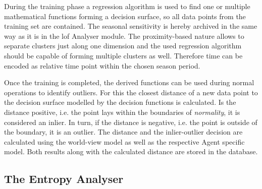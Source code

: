 During the training phase a regression algorithm is used to find one or multiple mathematical functions forming a decision surface, so all data points from the training set are contained.
The seasonal sensitivity is hereby archived in the same way as it is in the \gls{lof} Analyser module. The proximity-based nature allows to separate clusters just along one dimension and the used regression algorithm should be capable of forming multiple clusters as well. Therefore time can be encoded as relative time point within the chosen season period.

Once the training is completed, the derived functions can be used during normal operations to identify outliers.
For this the closest distance of a new data point to the decision surface modelled by the decision functions is calculated.
Is the distance positive, i.e. the point lays within the boundaries of \emph{normality}, it is considered an inlier.
In turn, if the distance is negative, i.e. the point is outside of the boundary, it is an outlier.
The distance and the inlier-outlier decision are calculated using the world-view model as well as the respective Agent specific model.
Both results along with the calculated distance are stored in the database.

\subsection{The Entropy Analyser}
\label{sec:concept:anal:entropy}

